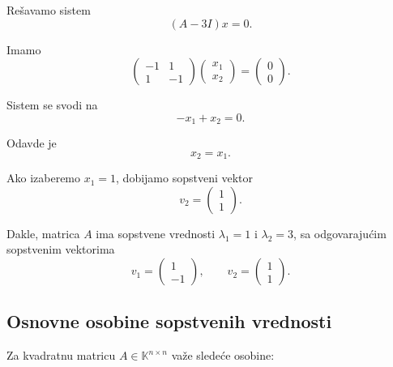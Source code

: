 \documentclass[12pt,a4paper]{report}
\begin{document}
Rešavamo sistem
\[
(A-3I)x=0.
\]

Imamo
\[
\begin{pmatrix}
	-1 & 1\\
	1 & -1
\end{pmatrix}
\begin{pmatrix}
	x_1\\
	x_2
\end{pmatrix}
=
\begin{pmatrix}
	0\\
	0
\end{pmatrix}.
\]

Sistem se svodi na
\[
-x_1+x_2=0.
\]

Odavde je
\[
x_2=x_1.
\]

Ako izaberemo $x_1=1$, dobijamo sopstveni vektor
\[
\boxed{
	v_2=
	\begin{pmatrix}
		1\\
		1
	\end{pmatrix}.
}
\]

Dakle, matrica $A$ ima sopstvene vrednosti
$\lambda_1=1$ i $\lambda_2=3$, sa odgovarajućim
sopstvenim vektorima
\[
v_1=
\begin{pmatrix}
	1\\
	-1
\end{pmatrix},
\qquad
v_2=
\begin{pmatrix}
	1\\
	1
\end{pmatrix}.
\]

\subsection{Osnovne osobine sopstvenih vrednosti}

Za kvadratnu matricu $A\in\mathbb{K}^{n\times n}$
važe sledeće osobine:
\end{document}
